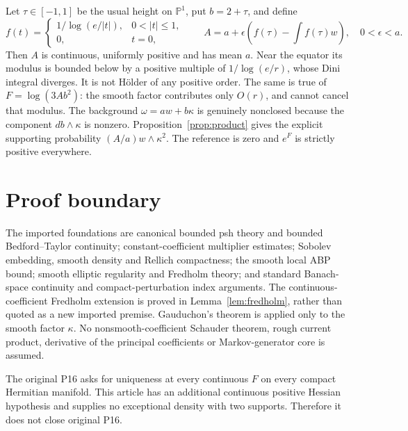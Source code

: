 \documentclass[11pt]{article}
\theoremstyle{remark}
\begin{document}
Let $\tau\in[-1,1]$ be the usual height on $\mathbb P^1$, put
$b=2+\tau$, and define
\[
 f(t)=\begin{cases}1/\log(e/|t|),&0<|t|\leq1,\\0,&t=0,\end{cases}
 \qquad A=a+\epsilon\left(f(\tau)-\int f(\tau)w\right),
 \quad0<\epsilon<a.
\]
Then $A$ is continuous, uniformly positive and has mean $a$.
Near the equator its modulus is bounded below by a positive multiple
of $1/\log(e/r)$, whose Dini integral diverges. It is not H\"older of
any positive order. The same is true of $F=\log(3Ab^2)$: the smooth
factor contributes only $O(r)$, and cannot cancel that modulus.
The background $\omega=aw+b\kappa$ is genuinely nonclosed because
the component $db\wedge\kappa$ is nonzero. Proposition~\ref{prop:product}
gives the explicit supporting probability $(A/a)w\wedge\kappa^2$.
The reference is zero and $e^F$ is strictly positive everywhere.

\section{Proof boundary}
The imported foundations are canonical bounded psh theory and bounded
Bedford--Taylor continuity; constant-coefficient multiplier estimates;
Sobolev embedding, smooth density and Rellich compactness; the smooth
local ABP bound; smooth elliptic regularity and Fredholm theory; and
standard Banach-space continuity and compact-perturbation index arguments.
The continuous-coefficient Fredholm extension is proved in
Lemma~\ref{lem:fredholm}, rather than quoted as a new imported premise.
Gauduchon's theorem is applied only to the smooth factor $\kappa$.
No nonsmooth-coefficient Schauder theorem, rough current product,
derivative of the principal coefficients or Markov-generator core is
assumed.

The original P16 asks for uniqueness at every continuous $F$ on every
compact Hermitian manifold. This article has an additional continuous
positive Hessian hypothesis and supplies no exceptional density with
two supports. Therefore it does not close original P16.
\end{document}
